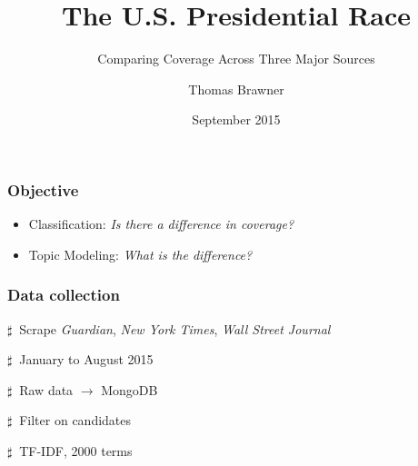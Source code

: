 \documentclass[11pt]{beamer}
\title{The U.S. Presidential Race}
\subtitle{Comparing Coverage Across Three Major Sources}
\author{Thomas Brawner}
\institute{\normalsize Galvanize, Inc.}
\date{September 2015}
\newenvironment{innerlist}[1][\enskip\textbullet]%
        {\begin{compactenum}[#1]}{\end{compactenum}}
\begin{document}
\maketitle


\begin{frame}
\frametitle{Objective}

\vspace{5mm}

\begin{itemize}
	\item Classification: {\it Is there a difference in coverage?}
	\vspace{4mm}
	\item Topic Modeling: {\it What is the difference?}
\end{itemize}

\end{frame}


\begin{frame}
\frametitle{Data collection}

\vspace{5mm}

\begin{innerlist}
	\item[$\sharp~$] Scrape {\it Guardian}, {\it New York Times}, {\it Wall Street Journal}
	\vspace{4mm}
	\item[$\sharp~$] January to August 2015
	\vspace{4mm}
	\item[$\sharp~$] Raw data $\rightarrow$ MongoDB
	\vspace{4mm}
	\item[$\sharp~$] Filter on candidates
	\vspace{4mm}
	\item[$\sharp~$] TF-IDF, 2000 terms
\end{innerlist}

\end{frame}

\end{document}
